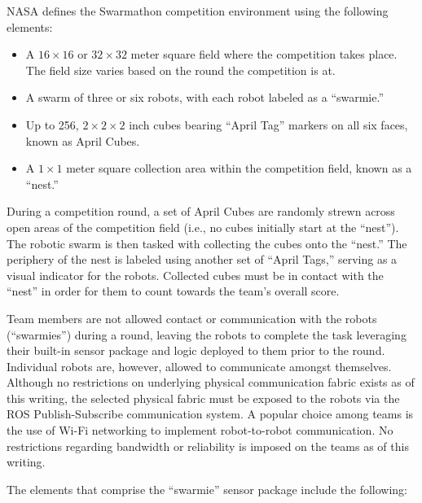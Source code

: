 \documentclass[sigconf,authordraft]{acmart}
\begin{document}
NASA defines the Swarmathon competition environment using the following
elements:

\begin{itemize}
  \item A $16 \times 16$ or $32 \times 32$ meter square field where the
  competition takes place. The field size varies based on the round the
  competition is at.
  \item A swarm of three or six robots, with each robot labeled as a
  ``swarmie.''
  \item Up to 256, $2 \times 2 \times 2$ inch cubes bearing ``April Tag''
  markers on all six faces, known as April Cubes.
  \item A $1 \times 1$ meter square collection area within the competition
  field, known as a ``nest.''
\end{itemize}

During a competition round, a set of April Cubes are randomly strewn across
open areas of the competition field (i.e., no cubes initially start at
the ``nest''). The robotic swarm is then tasked with collecting the cubes onto
the ``nest.'' The periphery of the nest is labeled using another set of ``April
Tags,'' serving as a visual indicator for the robots. Collected cubes must be
in contact with the ``nest'' in order for them to count towards the team's
overall score.

Team members are not allowed contact or communication with the robots
(``swarmies'') during a round, leaving the robots to complete the task
leveraging their built-in sensor package and logic deployed to them prior to the
round. Individual robots are, however, allowed to communicate amongst
themselves. Although no restrictions on underlying physical communication fabric
exists as of this writing, the selected physical fabric must be exposed to the
robots via the ROS Publish-Subscribe communication system. A popular choice among teams is the use of Wi-Fi networking to implement robot-to-robot communication. No restrictions regarding bandwidth or reliability is imposed on the teams as of this writing.

The elements that comprise the ``swarmie'' sensor package include the
following:
\end{document}

